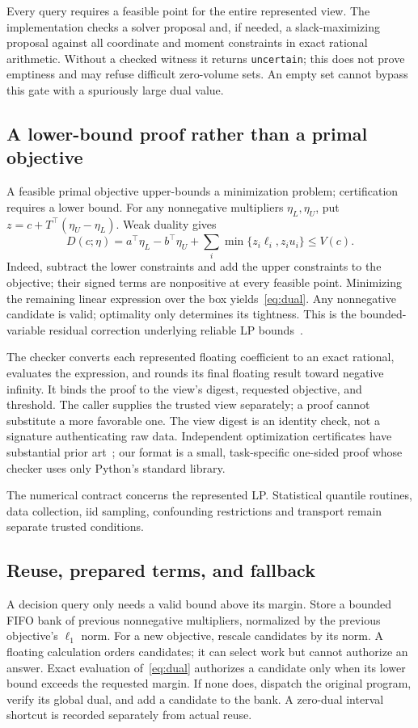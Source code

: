 \documentclass[conference]{IEEEtran}
\begin{document}
Every query requires a feasible point for the entire represented view. The implementation checks a solver proposal and, if needed, a slack-maximizing proposal against all coordinate and moment constraints in exact rational arithmetic. Without a checked witness it returns \texttt{uncertain}; this does not prove emptiness and may refuse difficult zero-volume sets. An empty set cannot bypass this gate with a spuriously large dual value.

\subsection{A lower-bound proof rather than a primal objective}
A feasible primal objective upper-bounds a minimization problem; certification requires a lower bound. For any nonnegative multipliers $\eta_L,\eta_U$, put $z=c+T^\top(\eta_U-\eta_L)$. Weak duality gives
\begin{equation}
 D(c;\eta)=a^\top\eta_L-b^\top\eta_U+
       \sum_i\min\{z_i\ell_i,z_i u_i\}\le V(c).\label{eq:dual}
\end{equation}
Indeed, subtract the lower constraints and add the upper constraints to the objective; their signed terms are nonpositive at every feasible point. Minimizing the remaining linear expression over the box yields~\eqref{eq:dual}. Any nonnegative candidate is valid; optimality only determines its tightness. This is the bounded-variable residual correction underlying reliable LP bounds~\cite{Neumaier2004SafeBounds}.

The checker converts each represented floating coefficient to an exact rational, evaluates the expression, and rounds its final floating result toward negative infinity. It binds the proof to the view's digest, requested objective, and threshold. The caller supplies the trusted view separately; a proof cannot substitute a more favorable one. The view digest is an identity check, not a signature authenticating raw data. Independent optimization certificates have substantial prior art~\cite{Cheung2017VIPR}; our format is a small, task-specific one-sided proof whose checker uses only Python's standard library.

The numerical contract concerns the represented LP. Statistical quantile routines, data collection, iid sampling, confounding restrictions and transport remain separate trusted conditions.

\subsection{Reuse, prepared terms, and fallback}
A decision query only needs a valid bound above its margin. Store a bounded FIFO bank of previous nonnegative multipliers, normalized by the previous objective's $\ell_1$ norm. For a new objective, rescale candidates by its norm. A floating calculation orders candidates; it can select work but cannot authorize an answer. Exact evaluation of~\eqref{eq:dual} authorizes a candidate only when its lower bound exceeds the requested margin. If none does, dispatch the original program, verify its global dual, and add a candidate to the bank. A zero-dual interval shortcut is recorded separately from actual reuse.
\end{document}
